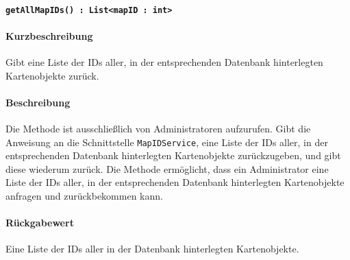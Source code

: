 \paragraph{\texttt{getAllMapIDs() : List<mapID : int>}}%
\paragraph*{Kurzbeschreibung}
Gibt eine Liste der IDs aller, in der entsprechenden Datenbank hinterlegten Kartenobjekte zurück.
\paragraph*{Beschreibung}
Die Methode ist ausschließlich von Administratoren aufzurufen.
Gibt die Anweisung an die Schnittstelle \texttt{MapIDService}, eine Liste der IDs aller, in der entsprechenden Datenbank hinterlegten Kartenobjekte zurückzugeben, und gibt diese wiederum zurück.
Die Methode ermöglicht, dass ein Administrator eine Liste der IDs aller, in der entsprechenden Datenbank hinterlegten Kartenobjekte anfragen und zurückbekommen kann.
\paragraph*{Rückgabewert}
Eine Liste der IDs aller in der Datenbank hinterlegten Kartenobjekte.
